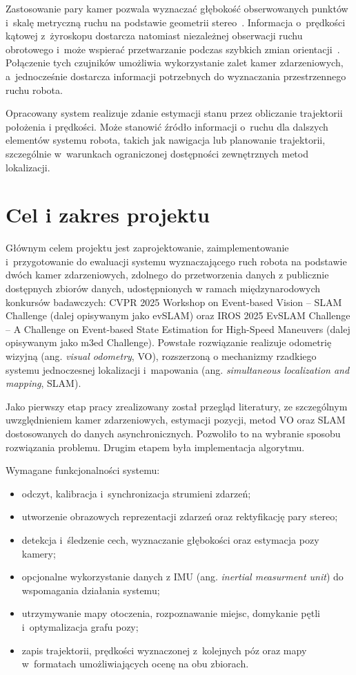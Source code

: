 Zastosowanie pary kamer pozwala wyznaczać głębokość obserwowanych punktów i~skalę metryczną ruchu na podstawie geometrii stereo~\cite{hartley2004multiple}. Informacja o~prędkości kątowej z~żyroskopu dostarcza natomiast niezależnej obserwacji ruchu obrotowego i~może wspierać przetwarzanie podczas szybkich zmian orientacji~\cite{kneip2011gyro}. Połączenie tych czujników umożliwia wykorzystanie zalet kamer zdarzeniowych, a~jednocześnie dostarcza informacji potrzebnych do wyznaczania przestrzennego ruchu robota.

Opracowany system realizuje zdanie estymacji stanu przez obliczanie trajektorii położenia i prędkości. Może stanowić źródło informacji o~ruchu dla dalszych elementów systemu robota, takich jak nawigacja lub planowanie trajektorii, szczególnie w~warunkach ograniczonej dostępności zewnętrznych metod lokalizacji.

\section{Cel i zakres projektu}
\label{sec:cel_i_zakres}

Głównym celem projektu jest zaprojektowanie, zaimplementowanie i~przygotowanie do ewaluacji systemu wyznaczającego ruch robota na podstawie dwóch kamer zdarzeniowych, zdolnego do przetworzenia danych z publicznie dostępnych zbiorów danych, udostępnionych w ramach międzynarodowych konkursów badawczych: CVPR 2025 Workshop on Event-based Vision -- SLAM Challenge \cite{evslam2025challenge} (dalej opisywanym jako evSLAM) oraz IROS 2025 EvSLAM Challenge -- A Challenge on Event-based State Estimation for High-Speed Maneuvers \cite{m3ed2025challenge} (dalej opisywanym jako m3ed Challenge). Powstałe rozwiązanie realizuje odometrię wizyjną (ang. \textit{visual odometry}, VO), rozszerzoną o mechanizmy rzadkiego systemu jednoczesnej lokalizacji i~mapowania (ang. \textit{simultaneous localization and mapping}, SLAM).

Jako pierwszy etap pracy zrealizowany został przegląd literatury, ze szczególnym uwzględnieniem kamer zdarzeniowych, estymacji pozycji, metod VO oraz SLAM dostosowanych do danych asynchronicznych. Pozwoliło to na wybranie sposobu rozwiązania problemu. Drugim etapem była implementacja algorytmu.

Wymagane funkcjonalności systemu:
\begin{itemize}
    \item odczyt, kalibracja i~synchronizacja strumieni zdarzeń;
    \item utworzenie obrazowych reprezentacji zdarzeń oraz rektyfikację pary stereo;
    \item detekcja i~śledzenie cech, wyznaczanie głębokości oraz estymacja pozy kamery;
    \item opcjonalne wykorzystanie danych z IMU (ang. \textit{inertial measurment unit}) do wspomagania działania systemu;
    \item utrzymywanie mapy otoczenia, rozpoznawanie miejsc, domykanie pętli i~optymalizacja grafu pozy;
    \item zapis trajektorii, prędkości wyznaczonej z~kolejnych póz oraz mapy w~formatach umożliwiających ocenę na obu zbiorach.
\end{itemize}


